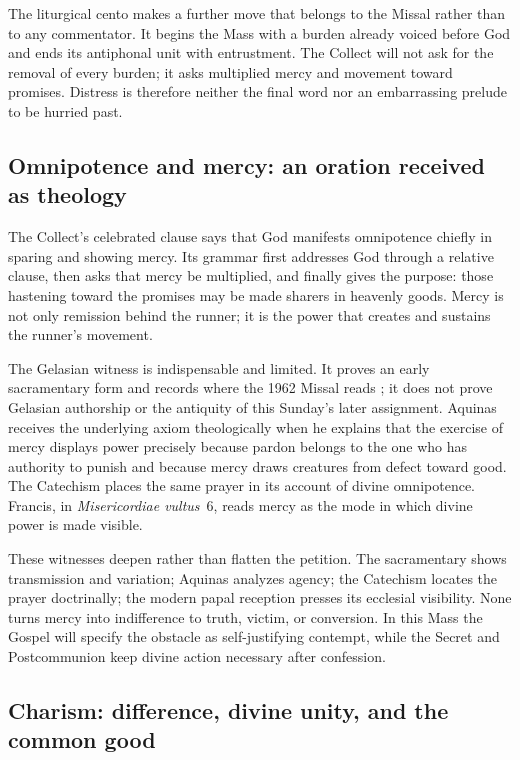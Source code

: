 The liturgical cento makes a further move that belongs to the Missal rather
than to any commentator. It begins the Mass with a burden already voiced before
God and ends its antiphonal unit with entrustment. The Collect will not ask for
the removal of every burden; it asks multiplied mercy and movement toward
promises. Distress is therefore neither the final word nor an embarrassing
prelude to be hurried past.

\subsection*{Omnipotence and mercy: an oration received as theology\enspace{}}

The Collect's celebrated clause says that God manifests omnipotence chiefly in
sparing and showing mercy. Its grammar first addresses God through a relative
clause, then asks that mercy be multiplied, and finally gives the purpose:
those hastening toward the promises may be made sharers in heavenly goods.
Mercy is not only remission behind the runner; it is the power that creates
and sustains the runner's movement.

The Gelasian witness is indispensable and limited. It proves an early
sacramentary form and records  where the 1962 Missal reads
; it does not prove Gelasian authorship or the antiquity
of this Sunday's later assignment. Aquinas receives the underlying axiom
theologically when he explains that the exercise of mercy displays power
precisely because pardon belongs to the one who has authority to punish and
because mercy draws creatures from defect toward good. The Catechism places
the same prayer in its account of divine omnipotence. Francis, in
\emph{Misericordiae vultus}~6, reads mercy as the mode in which divine power is
made visible.

These witnesses deepen rather than flatten the petition. The sacramentary
shows transmission and variation; Aquinas analyzes agency; the Catechism
locates the prayer doctrinally; the modern papal reception presses its
ecclesial visibility. None turns mercy into indifference to truth, victim, or
conversion. In this Mass the Gospel will specify the obstacle as
self-justifying contempt, while the Secret and Postcommunion keep divine
action necessary after confession.

\subsection*{Charism: difference, divine unity, and the common good\enspace{}}

